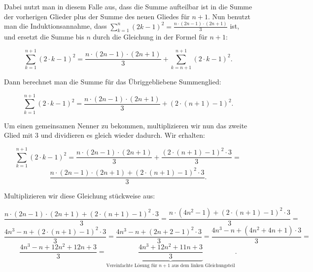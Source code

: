 \documentclass{scrartcl}
\begin{document}
Dabei nutzt man in diesem Falle aus, dass die Summe aufteilbar ist in die Summe
der vorherigen Glieder plus der Summe des neuen Gliedes für $n + 1$. Nun benutzt
man die Induktionsannahme, dass 
$\sum_{k = 1}^n (2k - 1)^2 = \frac{n\cdot (2n - 1) \cdot (2n + 1)}{3}$
ist, und ersetzt die Summe bis $n$ durch die Gleichung in der Formel für $n + 1$:

\begin{equation}
	\sum_{k = 1}^{n + 1} (2\cdot k - 1)^2 = 
	\frac{n\cdot (2n - 1) \cdot (2n + 1)}{3}
	+ \sum_{k = n + 1}^{n + 1} (2 \cdot k -1)^2.
\end{equation}

Dann berechnet man die Summe für das Übriggebliebene Summenglied:

\begin{equation}
	\sum_{k = 1}^{n + 1} (2\cdot k - 1)^2 = 
	\frac{n\cdot (2n - 1) \cdot (2n + 1)}{3} + (2 \cdot (n + 1) -1)^2.
\end{equation}

Um einen gemeinsamen Nenner zu bekommen, multiplizieren wir nun das zweite Glied
mit 3 und dividieren es gleich wieder dadurch. Wir erhalten:

\begin{equation}
	\sum_{k = 1}^{n + 1} (2\cdot k - 1)^2 = 
	\frac{n\cdot (2n - 1) \cdot (2n + 1)}{3} + \frac{(2 \cdot (n + 1) -1)^2 \cdot 3}{3} =
\end{equation}
\begin{equation*}
	\frac{n\cdot (2n - 1) \cdot (2n + 1) + (2 \cdot (n + 1) -1)^2 \cdot 3}{3}.
\end{equation*}

Multiplizieren wir diese Gleichung stückweise aus:

\begin{equation}
	\frac{n\cdot (2n - 1) \cdot (2n + 1) + (2 \cdot (n + 1) - 1)^2 \cdot 3}{3} = 
	\frac{n\cdot (4n^2 -1) + (2 \cdot (n + 1) - 1)^2 \cdot 3}{3} = 
\end{equation}
\begin{equation*}
	\frac{4n^3 -n + (2 \cdot (n + 1) - 1)^2 \cdot 3}{3} = 
	\frac{4n^3 -n + (2n + 2 - 1)^2 \cdot 3}{3} = 
	\frac{4n^3 -n + (4n^2 + 4n + 1) \cdot 3}{3} = 
\end{equation*}
\begin{equation*}
	\frac{4n^3 -n + 12n^2 + 12n + 3}{3} = 
	\underbrace{\frac{4n^3 + 12n^2 + 11n + 3}{3}}_{\textrm{Vereinfachte\ Lösung\ für\ } n + 1\textrm{\ aus\ dem\ linken\ Gleichungsteil}}.
\end{equation*}
\end{document}
